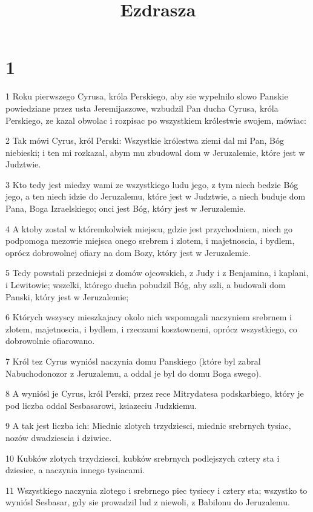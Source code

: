 

\title{Ezdrasza}


\chapter{1}

\par 1 Roku pierwszego Cyrusa, króla Perskiego, aby sie wypelnilo slowo Panskie powiedziane przez usta Jeremijaszowe, wzbudzil Pan ducha Cyrusa, króla Perskiego, ze kazal obwolac i rozpisac po wszystkiem królestwie swojem, mówiac:
\par 2 Tak mówi Cyrus, król Perski: Wszystkie królestwa ziemi dal mi Pan, Bóg niebieski; i ten mi rozkazal, abym mu zbudowal dom w Jeruzalemie, które jest w Judztwie.
\par 3 Kto tedy jest miedzy wami ze wszystkiego ludu jego, z tym niech bedzie Bóg jego, a ten niech idzie do Jeruzalemu, które jest w Judztwie, a niech buduje dom Pana, Boga Izraelskiego; onci jest Bóg, który jest w Jeruzalemie.
\par 4 A ktoby zostal w któremkolwiek miejscu, gdzie jest przychodniem, niech go podpomoga mezowie miejsca onego srebrem i zlotem, i majetnoscia, i bydlem, oprócz dobrowolnej ofiary na dom Bozy, który jest w Jeruzalemie.
\par 5 Tedy powstali przedniejsi z domów ojcowskich, z Judy i z Benjamina, i kaplani, i Lewitowie; wszelki, którego ducha pobudzil Bóg, aby szli, a budowali dom Panski, który jest w Jeruzalemie;
\par 6 Których wszyscy mieszkajacy okolo nich wspomagali naczyniem srebrnem i zlotem, majetnoscia, i bydlem, i rzeczami kosztownemi, oprócz wszystkiego, co dobrowolnie ofiarowano.
\par 7 Król tez Cyrus wyniósl naczynia domu Panskiego (które byl zabral Nabuchodonozor z Jeruzalemu, a oddal je byl do domu Boga swego).
\par 8 A wyniósl je Cyrus, król Perski, przez rece Mitrydatesa podskarbiego, który je pod liczba oddal Sesbasarowi, ksiazeciu Judzkiemu.
\par 9 A tak jest liczba ich: Miednic zlotych trzydziesci, miednic srebrnych tysiac, nozów dwadziescia i dziwiec.
\par 10 Kubków zlotych trzydziesci, kubków srebrnych podlejszych cztery sta i dziesiec, a naczynia innego tysiacami.
\par 11 Wszystkiego naczynia zlotego i srebrnego piec tysiecy i cztery sta; wszystko to wyniósl Sesbasar, gdy sie prowadzil lud z niewoli, z Babilonu do Jeruzalemu.

